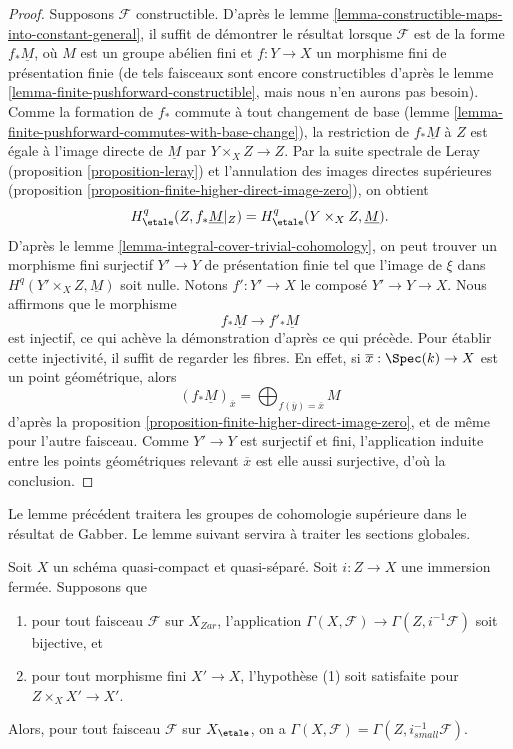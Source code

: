 \begin{proof}
\medskip\noindent
Supposons $\mathcal{F}$ constructible. D'après le
lemme \ref{lemma-constructible-maps-into-constant-general},
il suffit de démontrer le résultat lorsque $\mathcal{F}$
est de la forme $f_*\underline{M}$, où $M$ est un groupe abélien fini
et $f : Y \to X$ un morphisme fini de présentation finie
(de tels faisceaux sont encore constructibles d'après le
lemme \ref{lemma-finite-pushforward-constructible},
mais nous n'en aurons pas besoin).
Comme la formation de $f_*$ commute à tout changement de base
(lemme \ref{lemma-finite-pushforward-commutes-with-base-change}),
la restriction de $f_*\underline{M}$ à $Z$ est
égale à l'image directe de $\underline{M}$ par
$Y \times_X Z \to Z$. Par la suite spectrale de Leray
(proposition \ref{proposition-leray})
et l'annulation des images directes supérieures
(proposition \ref{proposition-finite-higher-direct-image-zero}),
on obtient
$$
H^q_\etale(Z, f_*\underline{M}|_Z) = H^q_\etale(Y \times_X Z, \underline{M}).
$$
D'après le lemme \ref{lemma-integral-cover-trivial-cohomology},
on peut trouver un morphisme fini surjectif $Y' \to Y$ de présentation finie
tel que l'image de $\xi$ dans $H^q(Y' \times_X Z, \underline{M})$ soit nulle.
Notons $f' : Y' \to X$ le composé $Y' \to Y \to X$. Nous affirmons que
le morphisme
$$
f_*\underline{M} \longrightarrow f'_*\underline{M}
$$
est injectif, ce qui achève la démonstration d'après ce qui précède.
Pour établir cette injectivité, il suffit de regarder les fibres. En effet,
si $\overline{x} : \Spec(k) \to X$ est un point géométrique, alors
$$
(f_*\underline{M})_{\overline{x}} =
\bigoplus\nolimits_{f(\overline{y}) = \overline{x}} M
$$
d'après la proposition \ref{proposition-finite-higher-direct-image-zero},
et de même pour l'autre faisceau.
Comme $Y' \to Y$ est surjectif et fini, l'application induite
entre les points géométriques relevant $\overline{x}$ est
elle aussi surjective, d'où la conclusion.
\end{proof}

\noindent
Le lemme précédent traitera les groupes de cohomologie supérieure dans
le résultat de Gabber. Le lemme suivant servira à traiter les
sections globales.

\begin{lemma}
\label{lemma-gabber-h0}
Soit $X$ un schéma quasi-compact et quasi-séparé.
Soit $i : Z \to X$ une immersion fermée. Supposons que
\begin{enumerate}
\item pour tout faisceau $\mathcal{F}$ sur $X_{Zar}$, l'application
$\Gamma(X, \mathcal{F}) \to \Gamma(Z, i^{-1}\mathcal{F})$
soit bijective, et
\item pour tout morphisme fini $X' \to X$, l'hypothèse (1) soit satisfaite
pour $Z \times_X X' \to X'$.
\end{enumerate}
Alors, pour tout faisceau $\mathcal{F}$ sur $X_\etale$, on a
$\Gamma(X, \mathcal{F}) = \Gamma(Z, i^{-1}_{small}\mathcal{F})$.
\end{lemma}

